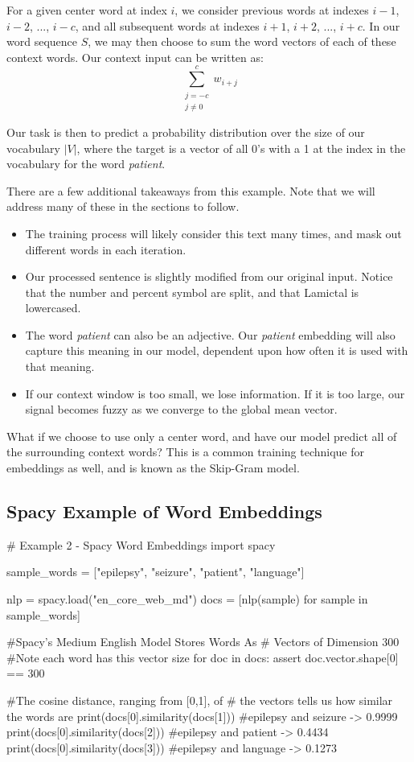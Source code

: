 For a given center word at index $i$, we consider previous words at indexes $i-1$, $i-2$, ..., $i-c$, and all subsequent words at indexes $i+1$, $i+2$, ..., $i+c$.
In our word sequence $S$, we may then choose to sum the word vectors of each of these context words.
Our context input can be written as:
\begin{equation}
  \sum_{ \substack {j=-c \\ j \neq 0}}^c w_{i+j}
\end{equation}

Our task is then to predict a probability distribution over the size of our vocabulary $|V|$, where the target is a vector of all 0's with a 1 at the index in the vocabulary for the word \textit{patient}.

There are a few additional takeaways from this example.
Note that we will address many of these in the sections to follow.
\begin{itemize}
  \item The training process will likely consider this text many times, and mask out different words in each iteration.
  \item Our processed sentence is slightly modified from our original input.
  Notice that the number and percent symbol are split, and that Lamictal is lowercased.
  \item The word \textit{patient} can also be an adjective.
  Our \textit{patient} embedding will also capture this meaning in our model, dependent upon how often it is used with that meaning.
  \item If our context window is too small, we lose information.
  If it is too large, our signal becomes fuzzy as we converge to the global mean vector.
\end{itemize}

What if we choose to use only a center word, and have our model predict all of the surrounding context words?
This is a common training technique for embeddings as well, and is known as the Skip-Gram model.

\subsection{Spacy Example of Word Embeddings}

\begin{python}
  # Example 2 - Spacy Word Embeddings
  import spacy

  sample_words = ["epilepsy", "seizure",
                  "patient", "language"]

  nlp = spacy.load("en_core_web_md")
  docs = [nlp(sample) for sample in sample_words]

  #Spacy's Medium English Model Stores Words As
  # Vectors of Dimension 300
  #Note each word has this vector size
  for doc in docs:
      assert doc.vector.shape[0] == 300

  #The cosine distance, ranging from [0,1], of
  # the vectors tells us how similar the words are
  print(docs[0].similarity(docs[1]))
  #epilepsy and seizure -> 0.9999
  print(docs[0].similarity(docs[2]))
  #epilepsy and patient -> 0.4434
  print(docs[0].similarity(docs[3]))
  #epilepsy and language -> 0.1273
\end{python}

